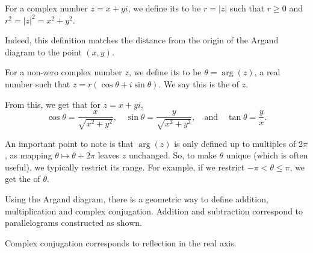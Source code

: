 \begin{definition}[Modulus]
	For a complex number $z = x + yi$, we define its  to be $r = |z|$ such that $r \geq 0$ and $r^2 = |z|^2 = x^2 + y^2$.
\end{definition}

Indeed, this definition matches the distance from the origin of the Argand diagram to the point $(x, y)$.

\begin{definition}[Argument]
	For a non-zero complex number $z$, we define its  to be $\theta = \arg(z)$, a real number such that $z = r(\cos \theta + i \sin \theta)$. We say this is the  of $z$.
\end{definition}

From this, we get that for $z = x + yi$,
$$
\cos \theta = \frac{x}{\sqrt{x^2 + y^2}}, \quad \sin \theta = \frac{y}{\sqrt{x^2 + y^2}}, \quad \text{and} \quad \tan \theta = \frac{y}{x}.
$$

An important point to note is that $\arg(z)$ is only defined up to multiples of $2 \pi$, as mapping $\theta \mapsto \theta + 2\pi$ leaves $z$ unchanged. So, to make $\theta$ unique (which is often useful), we typically restrict its range. For example, if we restrict $- \pi < \theta \leq \pi$, we get the  of $\theta$.

Using the Argand diagram, there is a geometric 
way to define addition, multiplication and complex conjugation. Addition and subtraction correspond to parallelograms constructed as shown.

\begin{center}
  \end{center}

  Complex conjugation corresponds to reflection in the real axis.


